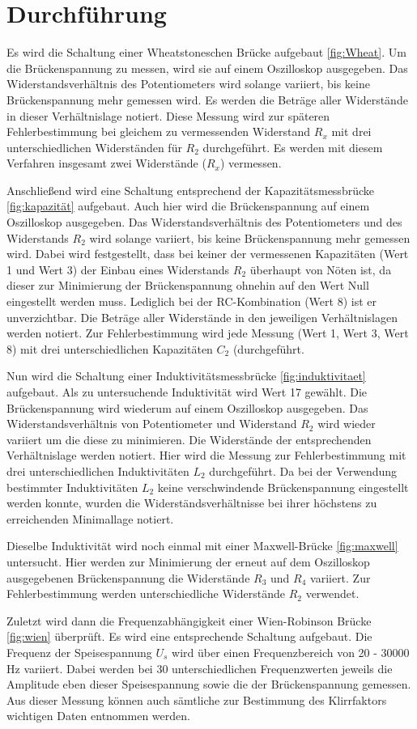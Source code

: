 \section{Durchführung}
\label{sec:Durchführung}

Es wird die Schaltung einer Wheatstoneschen Brücke aufgebaut \ref{fig:Wheat}.
Um die Brückenspannung zu messen, wird sie auf einem Oszilloskop ausgegeben.
Das Widerstandsverhältnis des Potentiometers wird solange variiert, bis keine
Brückenspannung mehr gemessen wird. Es werden die Beträge aller Widerstände in
dieser Verhältnislage notiert. Diese Messung wird zur späteren Fehlerbestimmung bei gleichem zu
vermessenden Widerstand $R_x$ mit drei unterschiedlichen Widerständen für $R_2$ durchgeführt.
Es werden mit diesem Verfahren insgesamt zwei Widerstände ($R_x$) vermessen.

Anschließend wird eine Schaltung entsprechend der Kapazitätsmessbrücke \ref{fig:kapazität}
aufgebaut. Auch hier wird die Brückenspannung auf einem Oszilloskop ausgegeben.
Das Widerstandsverhältnis des Potentiometers und des Widerstands $R_2$ wird solange variiert, bis keine
Brückenspannung mehr gemessen wird. Dabei wird festgestellt, dass bei keiner der
vermessenen Kapazitäten (Wert 1 und Wert 3) der Einbau eines Widerstands $R_2$
überhaupt von Nöten ist, da dieser zur Minimierung der Brückenspannung ohnehin auf
den Wert Null eingestellt werden muss. Lediglich bei der RC-Kombination (Wert 8)
ist er unverzichtbar. Die Beträge aller Widerstände in den jeweiligen Verhältnislagen
werden notiert. Zur Fehlerbestimmung wird jede Messung (Wert 1, Wert 3, Wert 8)
mit drei unterschiedlichen Kapazitäten $C_2$ (durchgeführt.

Nun wird die Schaltung einer Induktivitätsmessbrücke \ref{fig:induktivitaet} aufgebaut.
Als zu untersuchende Induktivität wird Wert 17 gewählt.
Die Brückenspannung wird wiederum auf einem Oszilloskop ausgegeben.
Das Widerstandsverhältnis von Potentiometer und Widerstand $R_2$ wird wieder
variiert um die diese zu minimieren. Die Widerstände der entsprechenden
Verhältnislage werden notiert. Hier wird die Messung zur Fehlerbestimmung mit
drei unterschiedlichen Induktivitäten $L_2$ durchgeführt.
Da bei der Verwendung bestimmter Induktivitäten $L_2$ keine verschwindende
Brückenspannung eingestellt werden konnte, wurden die Widerständsverhältnisse
bei ihrer höchstens zu erreichenden Minimallage notiert.

Dieselbe Induktivität wird noch einmal mit einer Maxwell-Brücke \ref{fig:maxwell} untersucht.
Hier werden zur Minimierung der erneut auf dem Oszilloskop ausgegebenen Brückenspannung
die Widerstände $R_3$ und $R_4$ variiert. Zur Fehlerbestimmung werden unterschiedliche
Widerstände $R_2$ verwendet.

Zuletzt wird dann die Frequenzabhängigkeit einer Wien-Robinson Brücke \ref{fig:wien}
überprüft. Es wird eine entsprechende Schaltung aufgebaut. Die Frequenz der
Speisespannung $U_s$ wird über einen Frequenzbereich von 20 - 30000 Hz variiert.
Dabei werden bei 30 unterschiedlichen Frequenzwerten jeweils die Amplitude eben dieser
Speisespannung sowie die der Brückenspannung gemessen. Aus dieser Messung können
auch sämtliche zur Bestimmung des Klirrfaktors wichtigen Daten entnommen werden.

